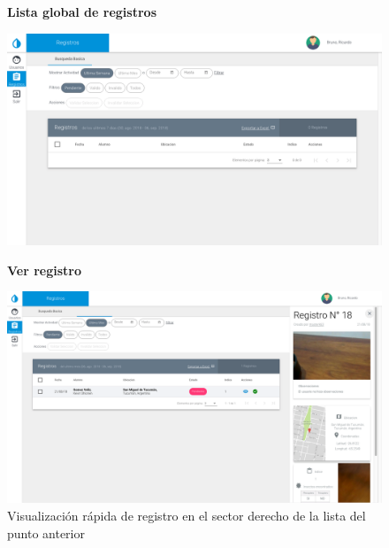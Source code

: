 				\begin{figure}[H]
					\hspace*{1cm}\raggedright\large\textbf{Lista global de registros}\par\medskip
					\centering
						\includegraphics[width=1\textwidth]{Screenshots/web/registroListar.png}
				\end{figure}

			
				\begin{figure}[H]
					\hspace*{1cm}\raggedright\large\textbf{Ver registro}\par\medskip
					\centering
						\includegraphics[width=1\textwidth]{Screenshots/web/registroVer1.png}
							\caption{Visualización rápida de registro en el sector derecho de la lista del punto anterior}
				\end{figure}
			

